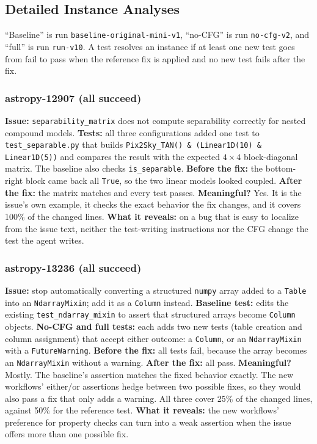 \documentclass[conference]{IEEEtran}
\begin{document}
\appendix

\subsection{Detailed Instance Analyses}
\label{app:instances}
``Baseline'' is run \texttt{baseline-original-mini-v1}, ``no-CFG'' is run \texttt{no-cfg-v2}, and ``full'' is run \texttt{run-v10}. A test resolves an instance if at least one new test goes from fail to pass when the reference fix is applied and no new test fails after the fix.

\subsubsection{astropy-12907 (all succeed)}
\textbf{Issue:} \texttt{separability\_matrix} does not compute separability correctly for nested compound models. \textbf{Tests:} all three configurations added one test to \texttt{test\_separable.py} that builds \texttt{Pix2Sky\_TAN() \& (Linear1D(10) \& Linear1D(5))} and compares the result with the expected $4\times4$ block-diagonal matrix. The baseline also checks \texttt{is\_separable}. \textbf{Before the fix:} the bottom-right block came back all \texttt{True}, so the two linear models looked coupled. \textbf{After the fix:} the matrix matches and every test passes. \textbf{Meaningful?} Yes. It is the issue's own example, it checks the exact behavior the fix changes, and it covers 100\% of the changed lines. \textbf{What it reveals:} on a bug that is easy to localize from the issue text, neither the test-writing instructions nor the CFG change the test the agent writes.

\subsubsection{astropy-13236 (all succeed)}
\textbf{Issue:} stop automatically converting a structured \texttt{numpy} array added to a \texttt{Table} into an \texttt{NdarrayMixin}; add it as a \texttt{Column} instead. \textbf{Baseline test:} edits the existing \texttt{test\_ndarray\_mixin} to assert that structured arrays become \texttt{Column} objects. \textbf{No-CFG and full tests:} each adds two new tests (table creation and column assignment) that accept either outcome: a \texttt{Column}, or an \texttt{NdarrayMixin} with a \texttt{FutureWarning}. \textbf{Before the fix:} all tests fail, because the array becomes an \texttt{NdarrayMixin} without a warning. \textbf{After the fix:} all pass. \textbf{Meaningful?} Mostly. The baseline's assertion matches the fixed behavior exactly. The new workflows' either/or assertions hedge between two possible fixes, so they would also pass a fix that only adds a warning. All three cover 25\% of the changed lines, against 50\% for the reference test. \textbf{What it reveals:} the new workflows' preference for property checks can turn into a weak assertion when the issue offers more than one possible fix.
\end{document}
